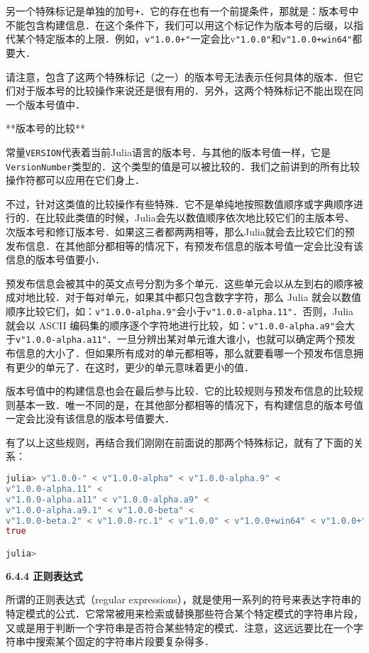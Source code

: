 另一个特殊标记是单独的加号\verb|+|．它的存在也有一个前提条件，那就是：版本号中不能包含构建信息．在这个条件下，我们可以用这个标记作为版本号的后缀，以指代某个特定版本的上限．例如，\verb|v"1.0.0+"|一定会比v\verb|"1.0.0"|和\verb|v"1.0.0+win64"|都要大．

请注意，包含了这两个特殊标记（之一）的版本号无法表示任何具体的版本．但它们对于版本号的比较操作来说还是很有用的．另外，这两个特殊标记不能出现在同一个版本号值中．

**版本号的比较**

常量\verb|VERSION|代表着当前Julia语言的版本号．与其他的版本号值一样，它是\verb|VersionNumber|类型的．这个类型的值是可以被比较的．我们之前讲到的所有比较操作符都可以应用在它们身上．

不过，针对这类值的比较操作有些特殊．它不是单纯地按照数值顺序或字典顺序进行的．在比较此类值的时候，Julia会先以数值顺序依次地比较它们的主版本号、次版本号和修订版本号．如果这三者都两两相等，那么Julia就会去比较它们的预发布信息．在其他部分都相等的情况下，有预发布信息的版本号值一定会比没有该信息的版本号值要小．

预发布信息会被其中的英文点号分割为多个单元．这些单元会以从左到右的顺序被成对地比较．对于每对单元，如果其中都只包含数字字符，那么 Julia 就会以数值顺序比较它们，如：\verb|v"1.0.0-alpha.9"|会小于\verb|v"1.0.0-alpha.11"|．否则，Julia 就会以 ASCII 编码集的顺序逐个字符地进行比较，如：\verb|v"1.0.0-alpha.a9"|会大于\verb|v"1.0.0-alpha.a11"|．一旦分辨出某对单元谁大谁小，也就可以确定两个预发布信息的大小了．但如果所有成对的单元都相等，那么就要看哪一个预发布信息拥有更少的单元了．在这时，更少的单元意味着更小的值．

版本号值中的构建信息也会在最后参与比较．它的比较规则与预发布信息的比较规则基本一致．唯一不同的是，在其他部分都相等的情况下，有构建信息的版本号值一定会比没有该信息的版本号值要大．

有了以上这些规则，再结合我们刚刚在前面说的那两个特殊标记，就有了下面的关系：
\begin{lstlisting}[language=julia]
julia> v"1.0.0-" < v"1.0.0-alpha" < v"1.0.0-alpha.9" < 
v"1.0.0-alpha.11" < 
v"1.0.0-alpha.a11" < v"1.0.0-alpha.a9" < 
v"1.0.0-alpha.a9.1" < v"1.0.0-beta" < 
v"1.0.0-beta.2" < v"1.0.0-rc.1" < v"1.0.0" < v"1.0.0+win64" < v"1.0.0+"
true

julia> 
\end{lstlisting}

\textbf{6.4.4 正则表达式}

所谓的正则表达式（regular expressions），就是使用一系列的符号来表达字符串的特定模式的公式．它常常被用来检索或替换那些符合某个特定模式的字符串片段，又或是用于判断一个字符串是否符合某些特定的模式．注意，这远远要比在一个字符串中搜索某个固定的字符串片段要复杂得多．

